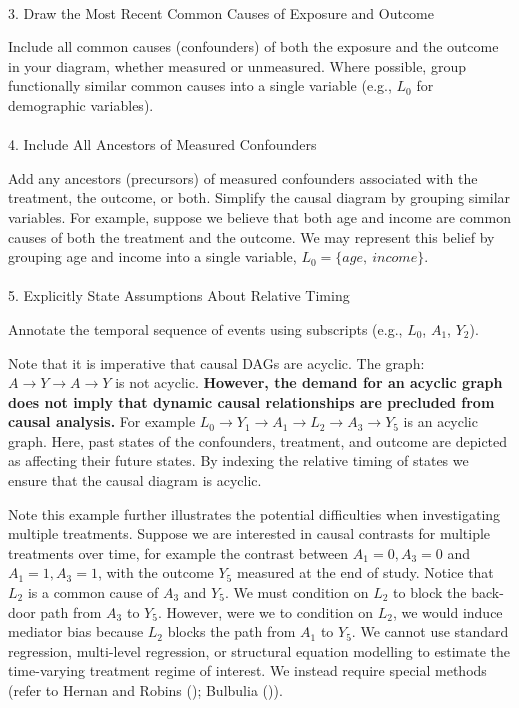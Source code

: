 \documentclass[
  singlecolumn]{article}
\makeatletter
\let\oldparagraph\paragraph
\renewcommand{\paragraph}{
    \@ifstar
      \xxxParagraphStar
      \xxxParagraphNoStar
  }
\newcommand{\xxxParagraphStar}[1]{\oldparagraph*{#1}\mbox{}}
\newcommand{\xxxParagraphNoStar}[1]{\oldparagraph{#1}\mbox{}}
\makeatother
\begin{document}
\paragraph{3. Draw the Most Recent Common Causes of Exposure and
Outcome}\label{draw-the-most-recent-common-causes-of-exposure-and-outcome}

Include all common causes (confounders) of both the exposure and the
outcome in your diagram, whether measured or unmeasured. Where possible,
group functionally similar common causes into a single variable (e.g.,
\(L_0\) for demographic variables).

\paragraph{4. Include All Ancestors of Measured
Confounders}\label{include-all-ancestors-of-measured-confounders}

Add any ancestors (precursors) of measured confounders associated with
the treatment, the outcome, or both. Simplify the causal diagram by
grouping similar variables. For example, suppose we believe that both
age and income are common causes of both the treatment and the outcome.
We may represent this belief by grouping age and income into a single
variable, \(L_0 = \{age,~income\}\).

\paragraph{5. Explicitly State Assumptions About Relative
Timing}\label{explicitly-state-assumptions-about-relative-timing}

Annotate the temporal sequence of events using subscripts (e.g.,
\(L_0\), \(A_1\), \(Y_2\)).

Note that it is imperative that causal DAGs are acyclic. The graph:
\(A \to Y \to A \to Y\) is not acyclic. \textbf{However, the demand for
an acyclic graph does not imply that dynamic causal relationships are
precluded from causal analysis.} For example
\(L_0 \to Y_1 \to  A_1 \to L_2 \to A_3 \to Y_5\) is an acyclic graph.
Here, past states of the confounders, treatment, and outcome are
depicted as affecting their future states. By indexing the relative
timing of states we ensure that the causal diagram is acyclic.

Note this example further illustrates the potential difficulties when
investigating multiple treatments. Suppose we are interested in causal
contrasts for multiple treatments over time, for example the contrast
between \(A_1 = 0, A_3 = 0\) and \(A_1 = 1, A_3 = 1\), with the outcome
\(Y_5\) measured at the end of study. Notice that \(L_2\) is a common
cause of \(A_3\) and \(Y_5\). We must condition on \(L_2\) to block the
back-door path from \(A_3\) to \(Y_5\). However, were we to condition on
\(L_2\), we would induce mediator bias because \(L_2\) blocks the path
from \(A_1\) to \(Y_5\). We cannot use standard regression, multi-level
regression, or structural equation modelling to estimate the
time-varying treatment regime of interest. We instead require special
methods (refer to Hernan and Robins
(); Bulbulia
()).
\end{document}
